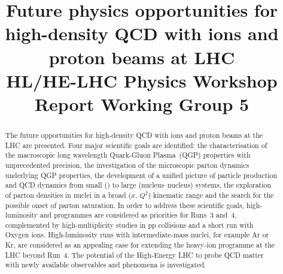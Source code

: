 \documentclass[11pt,twoside,a4paper]{cernrep}
\def\bibfiles{\main/bib/chapter,\main/introduction/bib/section,\main/schedule/bib/section,\main/hf/bib/section,\main/quarkonia/bib/section,\main/thermalradiation/bib/section,\main/flow/bib/section,\main/smallsystems/bib/section,\main/lightflavour/bib/section,\main/jets/bib/section,\main/smallx/bib/section,\main/beyond/bib/section,\main/helhc/bib/section,\main/accelerator/bib/section,\main/smallAexec/bib/section}
\providecommand{\biblio}{\nocite{article-minimal}\clearpage}  %
\begin{document}
\newcommand{\main}{.}



\title{Future physics opportunities for high-density QCD with ions and proton beams at LHC \\
HL/HE-LHC Physics Workshop Report Working Group 5}


\maketitle

\begin{abstract}
 The future opportunities for high-density QCD with ions and proton beams at the LHC are presented. Four major scientific goals are identified: the characterisation of the macroscopic long wavelength Quark-Gluon Plasma~(QGP) properties with unprecedented precision, the investigation of the microscopic parton dynamics underlying QGP properties, the development of a unified picture of particle production and QCD dynamics from small (\pp) to large (nucleus--nucleus) systems, the exploration of parton densities in nuclei in a broad ($x$, $Q^2$) kinematic range and the search for the possible onset of parton saturation. In order to address these scientific goals, high-luminosity \PbPb and \pPb programmes are considered as priorities for Runs~3 and~4, complemented by high-multiplicity studies in pp collisions and a  short run with Oxygen ions. High-luminosity runs with intermediate-mass nuclei, for example Ar or Kr, are considered as an appealing case for extending the heavy-ion programme at the LHC beyond Run~4. The potential of the High-Energy LHC to probe QCD matter with newly available observables and phenomena is investigated.
\end{abstract}

\setcounter{tocdepth}{2}
{ 
\baselineskip=12pt
\tableofcontents
}
\clearpage


\clearpage

\clearpage

\clearpage

\clearpage

\clearpage

\clearpage

\clearpage

\clearpage

\clearpage

\clearpage

\clearpage

\clearpage

\clearpage



%
%
\footnotesize
\biblio
\end{document}
